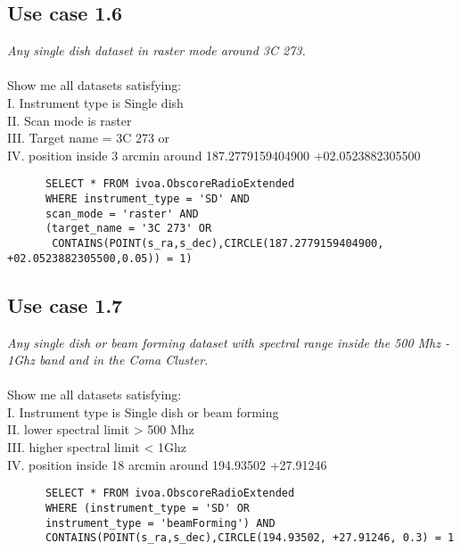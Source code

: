 \documentclass[11pt,a4paper]{ivoa}
\begin{document}
\subsection{Use case 1.6}
\textit{Any single dish  dataset  in raster mode around 3C 273.}\\ \\
Show me all datasets satisfying:\\
I. Instrument type is Single dish \\
II. Scan mode is raster \\
III. Target name = 3C 273 or \\
IV. position inside 3 arcmin around  	187.2779159404900 +02.0523882305500
\begin{verbatim}
      SELECT * FROM ivoa.ObscoreRadioExtended
      WHERE instrument_type = 'SD' AND
      scan_mode = 'raster' AND
      (target_name = '3C 273' OR
       CONTAINS(POINT(s_ra,s_dec),CIRCLE(187.2779159404900, +02.0523882305500,0.05)) = 1)     
\end{verbatim}

\subsection{Use case 1.7}
\textit{Any single dish or beam forming dataset  with spectral range inside the 500 Mhz - 1Ghz band and in the Coma Cluster.}\\ \\
Show me all datasets satisfying:\\
I. Instrument type is Single dish or beam forming \\
II. lower spectral limit > 500 Mhz \\
III. higher spectral limit < 1Ghz \\
IV. position inside 18 arcmin around 194.93502 +27.91246
\begin{verbatim}
      SELECT * FROM ivoa.ObscoreRadioExtended
      WHERE (instrument_type = 'SD' OR
      instrument_type = 'beamForming') AND
      CONTAINS(POINT(s_ra,s_dec),CIRCLE(194.93502, +27.91246, 0.3) = 1     
\end{verbatim}
\end{document}
